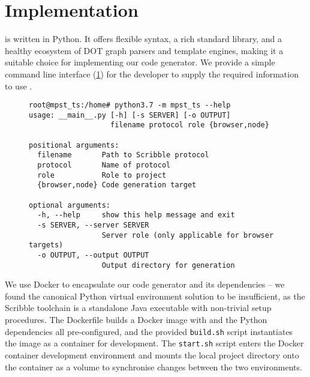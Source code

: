\section{Implementation}

 is written in Python. 
It offers flexible syntax, a rich standard library, and 
a healthy ecosystem of DOT graph parsers and template engines,
making it a suitable choice for implementing our code generator.
We provide a simple command line interface (\cref{lst:cmdline})
for the developer to supply the required information 
to use .

\begin{figure}[!ht]
\begin{lstlisting}
root@mpst_ts:/home# python3.7 -m mpst_ts --help
usage: __main__.py [-h] [-s SERVER] [-o OUTPUT]
                   filename protocol role {browser,node}

positional arguments:
  filename       Path to Scribble protocol
  protocol       Name of protocol
  role           Role to project
  {browser,node} Code generation target

optional arguments:
  -h, --help     show this help message and exit
  -s SERVER, --server SERVER
                 Server role (only applicable for browser targets)
  -o OUTPUT, --output OUTPUT
                 Output directory for generation
\end{lstlisting}
\label{lst:cmdline}
\end{figure}

We use Docker \cite{docker} to encapsulate our code generator
and its dependencies -- we found the canonical Python virtual environment
solution to be insufficient, as the Scribble toolchain is
a standalone Java executable with non-trivial setup procedures.
The Dockerfile builds a Docker image with  and
the Python dependencies all pre-configured, and the provided
\texttt{build.sh} script instantiates the image as a container 
for development.
The \texttt{start.sh} script enters the Docker container
development environment and mounts the local project directory
onto the container as a volume to synchronise changes between the
two environments.